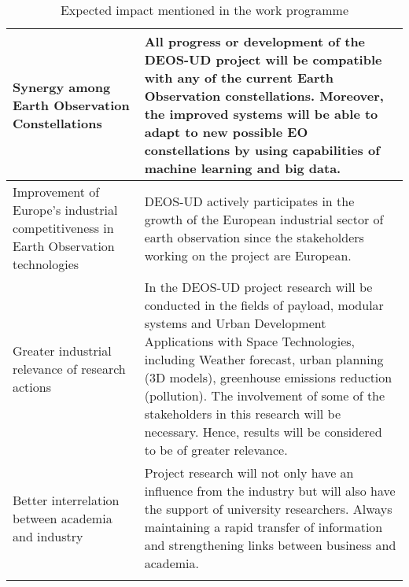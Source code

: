 \begin{longtable}{p{3cm} p{11cm}}
		\midrule
		
		Synergy among Earth Observation Constellations & All progress or development of the DEOS-UD project will be compatible with any of the current Earth Observation constellations. Moreover, the improved systems will be able to adapt to new possible EO constellations by using capabilities of machine learning and big data.\vspace{0.2cm}\\
		
		\midrule
		
		Improvement of Europe’s industrial competitiveness in Earth Observation technologies & DEOS-UD actively participates in the growth of the European industrial sector of earth observation since the stakeholders working on the project are European.\vspace{0.2cm}\\
		
		\midrule
		
		Greater industrial relevance of research actions & In the DEOS-UD project research will be conducted in the fields of payload, modular systems and Urban Development Applications with Space Technologies, including Weather forecast, urban planning (3D models), greenhouse emissions reduction (pollution). The involvement of some of the stakeholders in this research will be necessary. Hence, results will be considered to be of greater relevance.\vspace{0.2cm}\\
		
		\midrule
		
		Better interrelation between academia and industry & Project research will not only have an influence from the industry but will also have the support of university researchers. Always maintaining a rapid transfer of information and strengthening links between business and academia.\vspace{0.2cm}\\
		
		
		\bottomrule[2pt]
		

	\caption{Expected impact mentioned in the work programme}
\end{longtable}



